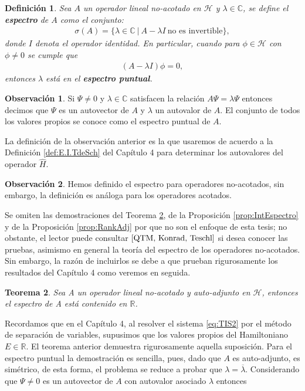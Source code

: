 \documentclass[12pt]{article}
\newtheorem{teo}{Teorema}[section]
\newtheorem{defn}[teo]{Definición}
\theoremstyle{definition}
\newtheorem{obs}{Observación}
\newcommand*{\field}[1]{\mathbb{#1}}
\begin{document}
\begin{defn}
    Sea $A$ un operador lineal no-acotado en $\mathcal{H}$ y $\lambda\in\field{C}$, se define el \textbf{espectro} de $A$ como el conjunto:
    \begin{align*}
        \sigma(A) = \{\lambda\in\field{C}\:|\: A-\lambda I\:\text{no es invertible} \},
    \end{align*}
    donde $I$ denota el operador identidad. En particular, cuando para $\phi\in\mathcal{H}$ con $\phi\neq0$ se cumple que 
    \begin{align*}
        (A-\lambda I)\phi = 0,
    \end{align*}
    entonces $\lambda$ está en el \textbf{espectro puntual}.
\end{defn}
\begin{obs}
    Si $\Psi\neq 0$ y $\lambda\in\field{C}$ satisfacen la relación $A\Psi = \lambda\Psi$ entonces decimos que $\Psi$ es un autovector de $A$ y $\lambda$ un autovalor de $A$. El conjunto de todos los valores propios se conoce como el espectro puntual de $A$. 
\end{obs}
\noindent
    La definición de la observación anterior es la que usaremos de acuerdo a la Definición \ref{def:E.I.TdeSch} del Capítulo 4 para determinar los autovalores del operador $\hat{H}$.
\begin{obs}
    Hemos definido el espectro para operadores no-acotados, sin embargo, la definición es análoga para los operadores acotados. 
\end{obs}
\noindent
Se omiten las demostraciones del Teorema \ref{teo:EspectroA}, de la Proposición \ref{prop:IntEspectro} y de la Proposición \ref{prop:RankAdj} por que no son el enfoque de esta tesis; no obstante, el lector puede consultar $\cite{QTM, Konrad, Teschl}$ si desea conocer las pruebas, asimismo en general la teoría del espectro de los operadores no-acotados. Sin embargo, la razón de incluirlos se debe a que prueban rigurosamente los resultados del Capítulo 4 como veremos en seguida.
\begin{teo}
    Sea A un operador lineal no-acotado y auto-adjunto en $\mathcal{H}$, entonces el espectro de A está contenido en $\field{R}$.
    \label{teo:EspectroA}
\end{teo}
\noindent
Recordamos que en el Capítulo 4, al resolver el sistema \eqref{eq:TIS2} por el método de separación de variables, supusimos que los valores propios del Hamiltoniano $E\in\field{R}$. El teorema anterior demuestra rigurosamente aquella suposición. Para el espectro puntual la demostración es sencilla, pues, dado que $A$ es auto-adjunto, es simétrico, de esta forma, el problema se reduce a probar que $\lambda=\overline{\lambda}$. Considerando que $\Psi\neq 0$ es un autovector de $A$ con autovalor asociado $\lambda$ entonces
\end{document}
